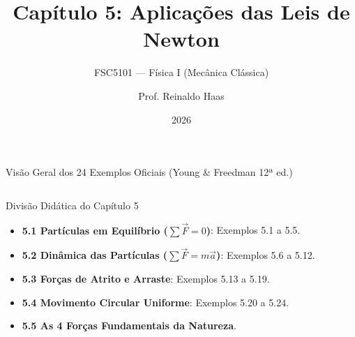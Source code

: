 \documentclass[10pt,aspectratio=169]{beamer}
\title[Capítulo 5: Aplicações das Leis de Newton]{Capítulo 5: Aplicações das Leis de Newton}
\subtitle{FSC5101 --- Física I (Mecânica Clássica)}
\author[Prof. Reinaldo Haas]{Prof. Reinaldo Haas}
\institute[UFSC]{Universidade Federal de Santa Catarina --- UFSC\\Departamento de Física}
\date{2026}
\begin{document}
\begin{frame}
    \titlepage
\end{frame}

\begin{frame}{Visão Geral dos 24 Exemplos Oficiais (Young \& Freedman 12ª ed.)}
    \begin{columns}[T]
        \begin{block}{Divisão Didática do Capítulo 5}
            \small
            \begin{itemize}\setlength{\itemsep}{2pt}
                \item \textbf{5.1 Partículas em Equilíbrio ($\sum \vec{F} = 0$)}: Exemplos 5.1 a 5.5.
                \item \textbf{5.2 Dinâmica das Partículas ($\sum \vec{F} = m\vec{a}$)}: Exemplos 5.6 a 5.12.
                \item \textbf{5.3 Forças de Atrito e Arraste}: Exemplos 5.13 a 5.19.
                \item \textbf{5.4 Movimento Circular Uniforme}: Exemplos 5.20 a 5.24.
                \item \textbf{5.5 As 4 Forças Fundamentais da Natureza}.
            \end{itemize}
        \end{block}

        \begin{center}
        \end{center}
    \end{columns}
\end{frame}
\end{document}
